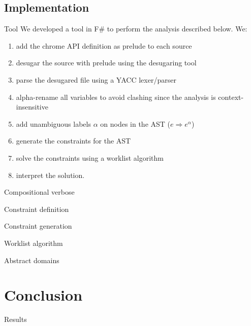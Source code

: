 \documentclass[11pt]{beamer}
\begin{document}
\subsection{Implementation}

\begin{frame}{Tool}
We developed a tool in F\# to perform the analysis described below. We:
\begin{enumerate}
\item add the chrome API definition as prelude to each source
\item desugar the source with prelude using the desugaring tool \cite{LambdaJS}
\item parse the desugared file using a YACC lexer/parser
\item alpha-rename all variables to avoid clashing since the analysis is context-insensitive
\item add unambiguous labels $\alpha$ on nodes in the AST ($e \Rightarrow e^\alpha$)
\item generate the constraints for the AST
\item solve the constraints using a worklist algorithm
\item interpret the solution.
\end{enumerate}
\end{frame}

\begin{frame}{Compositional verbose}

\end{frame}

\begin{frame}{Constraint definition}

\end{frame}

\begin{frame}{Constraint generation}

\end{frame}

\begin{frame}{Worklist algorithm}

\end{frame}

\begin{frame}{Abstract domains}

\end{frame}

\section{Conclusion}
\begin{frame}{Results}

\end{frame}
\end{document}
